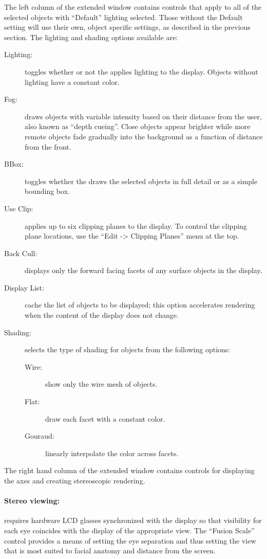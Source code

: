 The left column of the extended \viewer{} window contains controls that
apply to all of the selected objects with ``Default'' lighting selected.
Those without the Default setting will use their own, object specific
settings, as described in the previous section.  The lighting and shading
options available are:
%
\begin{description}
  \item [Lighting: ] toggles whether or not the \viewer{} applies lighting
        to the display.  Objects without lighting have a constant
        color.
  \item [Fog: ] draws objects with variable intensity based on their
        distance from the user, also known as ``depth cueing''.  Close
        objects appear brighter while more remote objects fade gradually
        into the background as a function of distance from the front.
  \item [BBox: ] toggles whether the \viewer{} draws the selected objects
        in full detail or as a simple bounding box.
  \item [Use Clip: ] applies up to six clipping planes to the display.
        To control the clipping plane locations, use the
        ``Edit -> Clipping Planes'' menu at the top.
  \item [Back Cull: ] displays only the forward facing facets of any surface
        objects in the display.
  \item [Display List: ] cache the list of objects to be displayed; this
        option accelerates rendering when the content of the display does
        not change. 
  \item [Shading: ] selects the type of shading for objects from the
        following options:
        \begin{description}
          \item [Wire: ] show only the wire mesh of objects.
          \item [Flat: ] draw each facet with a constant color.
          \item [Gouraud: ] linearly interpolate the color across facets. 
        \end{description}
\end{description}

The right hand column of the extended \viewer{} window contains controls
for displaying the axes and creating stereoscopic rendering.  

\paragraph{Stereo viewing: } requires hardware LCD glasses synchronized
with the display so that visibility for each eye coincides with the
display of the appropriate view.  The ``Fusion Scale'' control provides a
means of setting the eye separation and thus setting the view that is most
suited to facial anatomy and distance from the screen.

